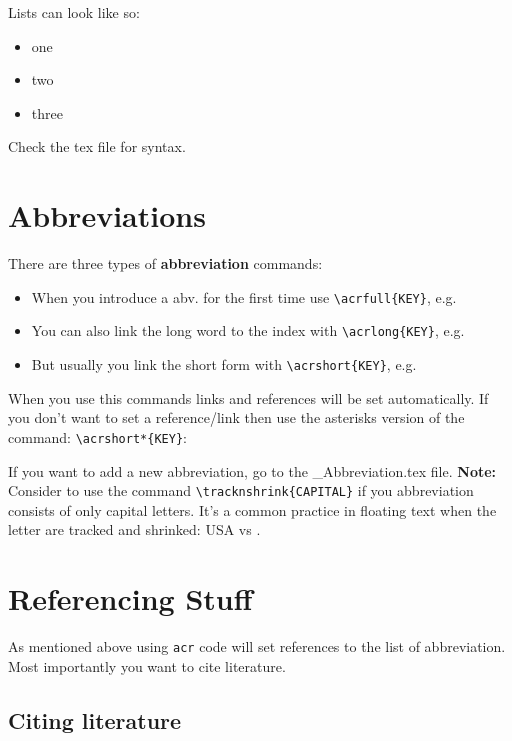 Lists can look like so:

\begin{itemize}
	\setlength\itemsep{-0.75em} %
	\item one
	\item two
	\item three
\end{itemize}

Check the tex file for syntax.

\section{Abbreviations}

There are three types of \textbf{abbreviation} commands:

\begin{itemize}
	\setlength\itemsep{-0.75em} %
	\item When you introduce a abv. for the first time use \verb|\acrfull{KEY}|, e.g. %
	\item You can also link the long word to the index with \verb|\acrlong{KEY}|, e.g. %
	\item But usually you link the short form with \verb|\acrshort{KEY}|, e.g. %
\end{itemize}

When you use this commands links and references will be set automatically. If you don’t want to set a reference/link then use the asterisks version of the command: \verb|\acrshort*{KEY}|: %

If you want to add a new abbreviation, go to the \_Abbreviation.tex file. \textbf{Note:} Consider to use the command \verb|\tracknshrink{CAPITAL}| if you abbreviation consists of only capital letters. It’s a common practice in floating text when the letter are tracked and shrinked: USA vs . 

\section{Referencing Stuff}

As mentioned above using \verb|acr| code will set references to the list of abbreviation. Most importantly you want to cite literature. 

\subsection{Citing literature}

